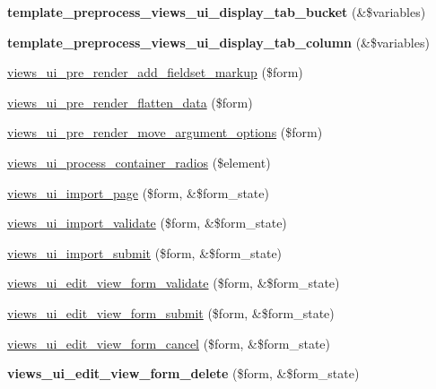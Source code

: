 \begin{DoxyCompactItemize}
\item 
\hypertarget{admin_8inc_a3cf5ad806c1e18e16c84bd7e3b941bbb}{
{\bfseries template\_\-preprocess\_\-views\_\-ui\_\-display\_\-tab\_\-bucket} (\&\$variables)}
\label{admin_8inc_a3cf5ad806c1e18e16c84bd7e3b941bbb}

\item 
\hypertarget{admin_8inc_a692bf5f96f7c497be2814b402e7da149}{
{\bfseries template\_\-preprocess\_\-views\_\-ui\_\-display\_\-tab\_\-column} (\&\$variables)}
\label{admin_8inc_a692bf5f96f7c497be2814b402e7da149}

\item 
\hyperlink{admin_8inc_a9a22d87a88a8d236a2695334870e5207}{views\_\-ui\_\-pre\_\-render\_\-add\_\-fieldset\_\-markup} (\$form)
\item 
\hyperlink{admin_8inc_a64b5ca8b414d5900230580914e518a39}{views\_\-ui\_\-pre\_\-render\_\-flatten\_\-data} (\$form)
\item 
\hyperlink{admin_8inc_a994257090e927793bf4b762d505191ef}{views\_\-ui\_\-pre\_\-render\_\-move\_\-argument\_\-options} (\$form)
\item 
\hyperlink{admin_8inc_ab9c0f7846e67e455a5fb82e7437e6049}{views\_\-ui\_\-process\_\-container\_\-radios} (\$element)
\item 
\hyperlink{admin_8inc_aa592ceb8e1152587900515340b0678a7}{views\_\-ui\_\-import\_\-page} (\$form, \&\$form\_\-state)
\item 
\hyperlink{admin_8inc_ad5771e62497700de3986f6b03a5a3ab6}{views\_\-ui\_\-import\_\-validate} (\$form, \&\$form\_\-state)
\item 
\hyperlink{admin_8inc_af208375534e14a238da0f2979bd7c43e}{views\_\-ui\_\-import\_\-submit} (\$form, \&\$form\_\-state)
\item 
\hyperlink{admin_8inc_a64c87654d6ff972d3755b11283257766}{views\_\-ui\_\-edit\_\-view\_\-form\_\-validate} (\$form, \&\$form\_\-state)
\item 
\hyperlink{admin_8inc_a1175fee9669154b7486a7e2fbfc6efae}{views\_\-ui\_\-edit\_\-view\_\-form\_\-submit} (\$form, \&\$form\_\-state)
\item 
\hyperlink{admin_8inc_ac138be787565f55b939741a65574a8ea}{views\_\-ui\_\-edit\_\-view\_\-form\_\-cancel} (\$form, \&\$form\_\-state)
\item 
\hypertarget{admin_8inc_a91797216dad6bf2d6ab57172c29f7e4d}{
{\bfseries views\_\-ui\_\-edit\_\-view\_\-form\_\-delete} (\$form, \&\$form\_\-state)}
\label{admin_8inc_a91797216dad6bf2d6ab57172c29f7e4d}


\end{DoxyCompactItemize}
